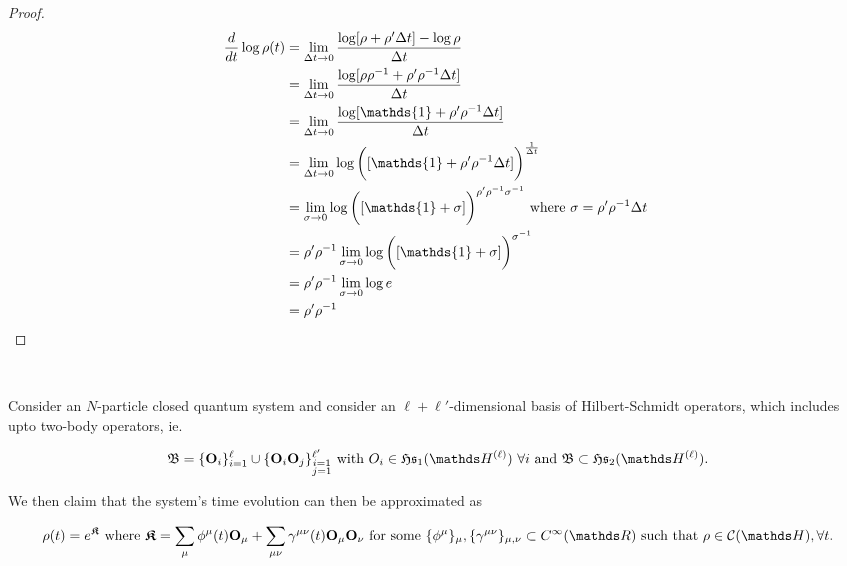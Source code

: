 \documentclass{homework}
\begin{document}
\begin{proof}
    
    \begin{align*}
        \frac{d}{dt} \log \rho(t) &= \lim_{\Delta t \rightarrow 0 } \frac{\log [ \rho + \rho' \Delta t ] - \log \rho}{\Delta t} \\
        &= \lim_{\Delta t \rightarrow 0 } \frac{\log [ \rho \rho^{-1} + \rho' \rho^{-1} \Delta t ]}{\Delta t} \\
        &=  \lim_{\Delta t \rightarrow 0 } \frac{\log [ \mathds{1} + \rho' \rho^{-1} \Delta t ]}{\Delta t} \\
        &= \lim_{\Delta t \rightarrow 0 } {\log \bigg([ \mathds{1} + \rho' \rho^{-1} \Delta t ]}\bigg)^{\frac{1}{\Delta t}} \\
        &= \lim_{\sigma \rightarrow 0 } {\log \bigg([ \mathds{1} + \sigma ]}\bigg)^{\rho' \rho^{-1}\sigma^{-1}} \textnormal{ where $\sigma = \rho' \rho^{-1} \Delta t$ } \\
        &= \rho' \rho^{-1} \lim_{\sigma \rightarrow 0 } {\log \bigg([ \mathds{1} + \sigma ]}\bigg)^{\sigma^{-1}} \\
        &= \rho' \rho^{-1} \lim_{\sigma \rightarrow 0 } \log e \\
        &=  \rho' \rho^{-1}
    \end{align*}
\end{proof}

\blanky \\

\begin{theo}
     Consider an $N$-particle closed quantum system and consider an $\ell+\ell'$-dimensional basis of Hilbert-Schmidt operators, which includes upto two-body operators, ie. 
     
     $$
     \mathfrak{B} = \{{\bf O}_i\}_{i=1}^{\ell} \cup \{{\bf O}_i {\bf O}_j\}_{\substack{i=1\\
                                        j=1}}^{\ell'} \textnormal{ with } O_i \in \mathfrak{H}\mathfrak{s}_1(\hilbert^{(\ell)})  \blanky \forall i \textnormal{ and } \mathfrak{B} \subset \mathfrak{H}\mathfrak{s}_2(\hilbert^{(\ell)}).
     $$
     
     We then claim that the system's time evolution can then be approximated as 
     
     $$
     \rho(t) = e^{\bm{\mathfrak{K}}} \textnormal{ where } \bm{\mathfrak{K}} = \sum_{\mu} \phi^{\mu}(t) {\bf O}_{\mu} + \sum_{\mu \nu} \gamma^{\mu \nu}(t) {\bf O}_\mu {\bf O}_\nu \textnormal{ for some } \{\phi^{\mu}\}_{\mu}, \{\gamma^{\mu \nu}\}_{{\mu, \nu}} \subset C^\infty(\R) \textnormal{ such that } \rho \in \statespace, \forall t.
     $$
     
\end{theo}
\end{document}
